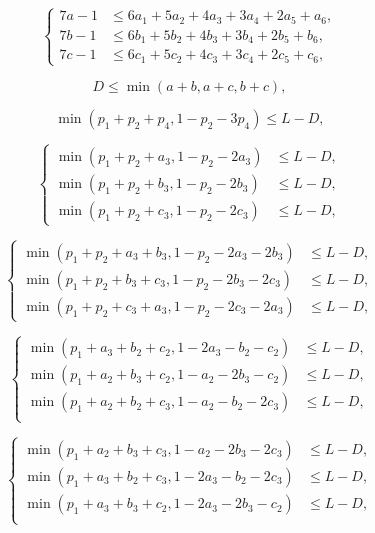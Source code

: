\documentclass[10pt,a4paper]{amsart}
\renewcommand{\le}{\leqslant}
\begin{document}
\begin{equation}
\left\{
\begin{aligned}
        7a-1 &\le 6a_1+5a_2+4a_3+3a_4+2a_5+a_6,\\
        7b-1 &\le 6b_1+5b_2+4b_3+3b_4+2b_5+b_6,\\
        7c-1 &\le 6c_1+5c_2+4c_3+3c_4+2c_5+c_6,
\end{aligned}
\right.
\end{equation}

        \begin{equation}
        D \le \min(a+b,a+c,b+c),
    \end{equation}

\begin{equation}
       \min(p_1+p_2+p_4,1-p_2-3p_4) \le L-D,
    \end{equation}

\begin{equation}
\left\{
\begin{aligned}
        \min(p_1+p_2+a_3,1-p_2-2a_3) &\le L-D,\\
        \min(p_1+p_2+b_3,1-p_2-2b_3) &\le L-D,\\
        \min(p_1+p_2+c_3,1-p_2-2c_3) &\le L-D,
\end{aligned}
\right.
\end{equation}

\begin{equation}
\left\{
\begin{aligned}
        \min(p_1+p_2+a_3+b_3,1-p_2-2a_3-2b_3) &\le L-D,\\
        \min(p_1+p_2+b_3+c_3,1-p_2-2b_3-2c_3) &\le L-D,\\
        \min(p_1+p_2+c_3+a_3,1-p_2-2c_3-2a_3) &\le L-D,
\end{aligned}
\right.
\end{equation}

\begin{equation}
\left\{
\begin{aligned}
        \min(p_1+a_3+b_2+c_2,1-2a_3-b_2-c_2) &\le L-D,\\
        \min(p_1+a_2+b_3+c_2,1-a_2-2b_3-c_2) &\le L-D,\\
        \min(p_1+a_2+b_2+c_3,1-a_2-b_2-2c_3) &\le L-D,\\
\end{aligned}
\right.
\end{equation}

\begin{equation}
\left\{
\begin{aligned}
        \min(p_1+a_2+b_3+c_3,1-a_2-2b_3-2c_3) &\le L-D,\\
        \min(p_1+a_3+b_2+c_3,1-2a_3-b_2-2c_3) &\le L-D,\\
        \min(p_1+a_3+b_3+c_2,1-2a_3-2b_3-c_2) &\le L-D,\\
\end{aligned}
\right.
\end{equation}
\end{document}

